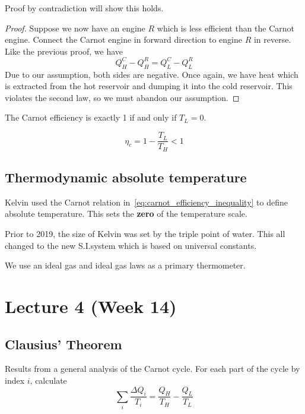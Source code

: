 \documentclass[12pt,chapterprefix=false,dvipsnames]{scrbook}
\theoremstyle{dotless}
\theoremstyle{definition}
\begin{document}
Proof by contradiction will show this holds.

\begin{proof}
	Suppose we now have an engine $R$ which is
	less efficient than the Carnot engine. Connect the Carnot engine
	in forward direction to engine $R$ in
	reverse. Like the previous proof, we have \[
		Q^C_H - Q^R_H = Q^C_L - Q^R_L
	\]
	Due to our assumption, both sides are negative. Once again, we
	have heat which is extracted from the hot reservoir and dumping
	it into the cold reservoir. This violates the second law, so we
	must abandon our assumption.
\end{proof}

The Carnot efficiency is exactly 1 if and only if
$T_L = 0$.

\begin{equation}
	\label{eq:carnot_efficiency_inequality}
	\eta_{c}
	=
	1 - \frac{T_L}{T_H} < 1
\end{equation}

\section{Thermodynamic absolute temperature}%
\label{sec:thermodynamic_absolute_temperature}

Kelvin used the Carnot relation in~\ref{eq:carnot_efficiency_inequality} to
define absolute temperature. This sets the
\textbf{zero} of the temperature scale.

Prior to 2019, the size of Kelvin was set by the triple point of
water. This all changed to the new S.I.\@ system which is based
on universal constants.

We use an ideal gas and ideal gas laws as a primary thermometer.

\chapter{Lecture 4 (Week 14)}%
\label{cha:lecture_4}

\section{Clausius' Theorem}%
\label{sec:clausius_theorem}

Results from a general analysis of the Carnot cycle. For each
part of the cycle by index $i$, calculate
\begin{equation}
	\sum_{i}\frac{\Delta Q_i}{T_i} =
	\frac{Q_H}{T_H} - \frac{Q_L}{T_L}
\end{equation}
\end{document}
